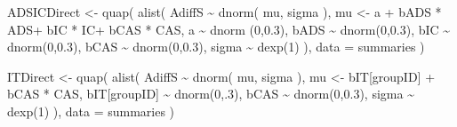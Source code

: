 \documentclass[
  10pt,
  dvipsnames,enabledeprecatedfontcommands]{scrartcl}
\newenvironment{Shaded}{\begin{snugshade}}{\end{snugshade}}
\newcommand{\AttributeTok}[1]{\textcolor[rgb]{0.77,0.63,0.00}{#1}}
\newcommand{\DecValTok}[1]{\textcolor[rgb]{0.00,0.00,0.81}{#1}}
\newcommand{\FloatTok}[1]{\textcolor[rgb]{0.00,0.00,0.81}{#1}}
\newcommand{\FunctionTok}[1]{\textcolor[rgb]{0.00,0.00,0.00}{#1}}
\newcommand{\NormalTok}[1]{#1}
\newcommand{\OtherTok}[1]{\textcolor[rgb]{0.56,0.35,0.01}{#1}}
\newcommand{\SpecialCharTok}[1]{\textcolor[rgb]{0.00,0.00,0.00}{#1}}
\begin{document}
\begin{Shaded}
\begin{Highlighting}[]
\NormalTok{ADSICDirect }\OtherTok{\textless{}{-}} \FunctionTok{quap}\NormalTok{(}
  \FunctionTok{alist}\NormalTok{(}
\NormalTok{    AdiffS }\SpecialCharTok{\textasciitilde{}} \FunctionTok{dnorm}\NormalTok{( mu, sigma ),}
\NormalTok{    mu }\OtherTok{\textless{}{-}}\NormalTok{  a }\SpecialCharTok{+}\NormalTok{ bADS }\SpecialCharTok{*}\NormalTok{ ADS}\SpecialCharTok{+}\NormalTok{ bIC }\SpecialCharTok{*}\NormalTok{ IC}\SpecialCharTok{+}\NormalTok{ bCAS }\SpecialCharTok{*}\NormalTok{ CAS,}
\NormalTok{    a }\SpecialCharTok{\textasciitilde{}} \FunctionTok{dnorm}\NormalTok{ (}\DecValTok{0}\NormalTok{,}\FloatTok{0.3}\NormalTok{),}
\NormalTok{    bADS }\SpecialCharTok{\textasciitilde{}} \FunctionTok{dnorm}\NormalTok{(}\DecValTok{0}\NormalTok{,}\FloatTok{0.3}\NormalTok{),}
\NormalTok{    bIC }\SpecialCharTok{\textasciitilde{}} \FunctionTok{dnorm}\NormalTok{(}\DecValTok{0}\NormalTok{,}\FloatTok{0.3}\NormalTok{),}
\NormalTok{    bCAS }\SpecialCharTok{\textasciitilde{}} \FunctionTok{dnorm}\NormalTok{(}\DecValTok{0}\NormalTok{,}\FloatTok{0.3}\NormalTok{),}
\NormalTok{    sigma  }\SpecialCharTok{\textasciitilde{}} \FunctionTok{dexp}\NormalTok{(}\DecValTok{1}\NormalTok{)}
\NormalTok{  ), }
  \AttributeTok{data =}\NormalTok{ summaries}
\NormalTok{)}

\NormalTok{ITDirect }\OtherTok{\textless{}{-}} \FunctionTok{quap}\NormalTok{(}
  \FunctionTok{alist}\NormalTok{(}
\NormalTok{    AdiffS }\SpecialCharTok{\textasciitilde{}} \FunctionTok{dnorm}\NormalTok{( mu, sigma ),}
\NormalTok{    mu }\OtherTok{\textless{}{-}}\NormalTok{  bIT[groupID] }\SpecialCharTok{+}\NormalTok{ bCAS }\SpecialCharTok{*}\NormalTok{ CAS,}
\NormalTok{    bIT[groupID] }\SpecialCharTok{\textasciitilde{}} \FunctionTok{dnorm}\NormalTok{(}\DecValTok{0}\NormalTok{,.}\DecValTok{3}\NormalTok{),}
\NormalTok{    bCAS }\SpecialCharTok{\textasciitilde{}} \FunctionTok{dnorm}\NormalTok{(}\DecValTok{0}\NormalTok{,}\FloatTok{0.3}\NormalTok{),}
\NormalTok{    sigma  }\SpecialCharTok{\textasciitilde{}} \FunctionTok{dexp}\NormalTok{(}\DecValTok{1}\NormalTok{)}
\NormalTok{  ), }
  \AttributeTok{data =}\NormalTok{ summaries}
\NormalTok{)}


\end{Highlighting}
\end{Shaded}
\end{document}
